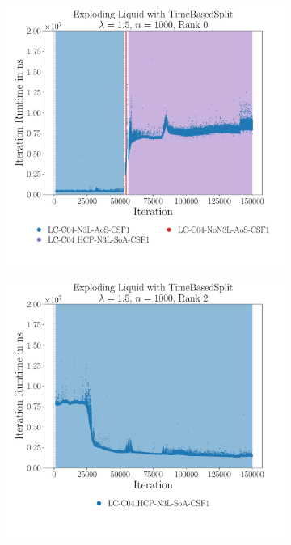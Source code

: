 
\begin{figure}[htpb]
	\begin{subfigure}[t]{0.5\textwidth}
		\vskip 0pt
		\centering
		\includegraphics[width=\textwidth]{./Figures/plots/exploding-liquid_configs_good.pdf}
		\vspace*{-1cm}
	\end{subfigure}%
	\begin{subfigure}[t]{0.5\textwidth}
		\vskip 0pt
		\centering
		\includegraphics[width=\textwidth]{./Figures/plots/exploding-liquid_configs_bad.pdf}

\end{subfigure}
\end{figure}
